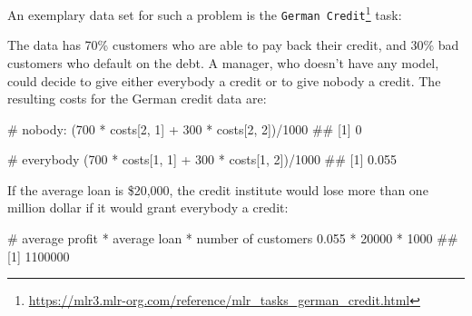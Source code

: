 \documentclass[12pt,]{scrbook}
\newenvironment{Shaded}{}{}
\newcommand{\CommentTok}[1]{\textcolor[rgb]{0.00,0.50,0.00}{#1}}
\newcommand{\DecValTok}[1]{#1}
\newcommand{\FloatTok}[1]{#1}
\newcommand{\KeywordTok}[1]{\textcolor[rgb]{0.00,0.00,1.00}{#1}}
\newcommand{\NormalTok}[1]{#1}
\newcommand{\OperatorTok}[1]{#1}
\newcommand{\StringTok}[1]{\textcolor[rgb]{0.00,0.50,0.50}{#1}}
\renewcommand{\href}[2]{#2\footnote{\url{#1}}}
\begin{document}
An exemplary data set for such a problem is the \href{https://mlr3.mlr-org.com/reference/mlr_tasks_german_credit.html}{\texttt{German\ Credit}} task:

\begin{Shaded}
\end{Shaded}

The data has 70\% customers who are able to pay back their credit, and 30\% bad customers who default on the debt.
A manager, who doesn't have any model, could decide to give either everybody a credit or to give nobody a credit.
The resulting costs for the German credit data are:

\begin{Shaded}
\begin{Highlighting}[]
\CommentTok{# nobody:}
\NormalTok{(}\DecValTok{700} \OperatorTok{*}\StringTok{ }\NormalTok{costs[}\DecValTok{2}\NormalTok{, }\DecValTok{1}\NormalTok{] }\OperatorTok{+}\StringTok{ }\DecValTok{300} \OperatorTok{*}\StringTok{ }\NormalTok{costs[}\DecValTok{2}\NormalTok{, }\DecValTok{2}\NormalTok{])}\OperatorTok{/}\DecValTok{1000}
\NormalTok{## [1] 0}

\CommentTok{# everybody}
\NormalTok{(}\DecValTok{700} \OperatorTok{*}\StringTok{ }\NormalTok{costs[}\DecValTok{1}\NormalTok{, }\DecValTok{1}\NormalTok{] }\OperatorTok{+}\StringTok{ }\DecValTok{300} \OperatorTok{*}\StringTok{ }\NormalTok{costs[}\DecValTok{1}\NormalTok{, }\DecValTok{2}\NormalTok{])}\OperatorTok{/}\DecValTok{1000}
\NormalTok{## [1] 0.055}
\end{Highlighting}
\end{Shaded}

If the average loan is \$20,000, the credit institute would lose more than one million dollar if it would grant everybody a credit:

\begin{Shaded}
\begin{Highlighting}[]
\CommentTok{# average profit * average loan * number of customers}
\FloatTok{0.055} \OperatorTok{*}\StringTok{ }\DecValTok{20000} \OperatorTok{*}\StringTok{ }\DecValTok{1000}
\NormalTok{## [1] 1100000}
\end{Highlighting}
\end{Shaded}
\end{document}
